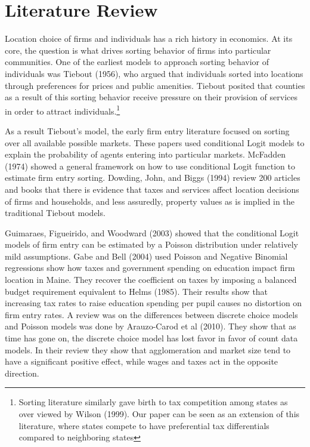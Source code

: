 
\section{Literature Review}

Location choice of firms and individuals has a rich history in economics. At its core, the question is what drives sorting behavior of firms into particular communities. One of the earliest models to approach sorting behavior of individuals was Tiebout (1956), who argued that individuals sorted into locations through preferences for prices and public amenities. Tiebout posited that counties as a result of this sorting behavior receive pressure on their provision of services in order to attract individuals.\footnote{Sorting literature similarly gave birth to tax competition among states as over viewed by Wilson (1999). Our paper can be seen as an extension of this literature, where states compete to have preferential tax differentials compared to neighboring states}

As a result Tiebout's model, the early firm entry literature focused on sorting over all available possible markets. These papers used conditional Logit models to explain the probability of agents entering into particular markets.  McFadden (1974) showed a general framework on how to use conditional Logit function to estimate firm entry sorting. Dowding, John, and Biggs (1994) review 200 articles and books that there is evidence that taxes and services affect location decisions of firms and households, and less assuredly, property values as is implied in the traditional Tiebout models.

Guimaraes, Figueirido, and Woodward (2003) showed that the conditional Logit models of firm entry can be estimated by a Poisson distribution under relatively mild assumptions. Gabe and Bell (2004) used Poisson and Negative Binomial regressions show how taxes and government spending on education impact firm location in Maine. They recover the coefficient on taxes by imposing a balanced budget requirement equivalent to Helms (1985). Their results show that increasing tax rates to raise education spending per pupil causes no distortion on firm entry rates. A review was on the differences between discrete choice models and Poisson models was done by Arauzo-Carod et al (2010). They show that as time has gone on, the discrete choice model has lost favor in favor of count data models. In their review they show that agglomeration and market size tend to have a significant positive effect, while wages and taxes act in the opposite direction.

